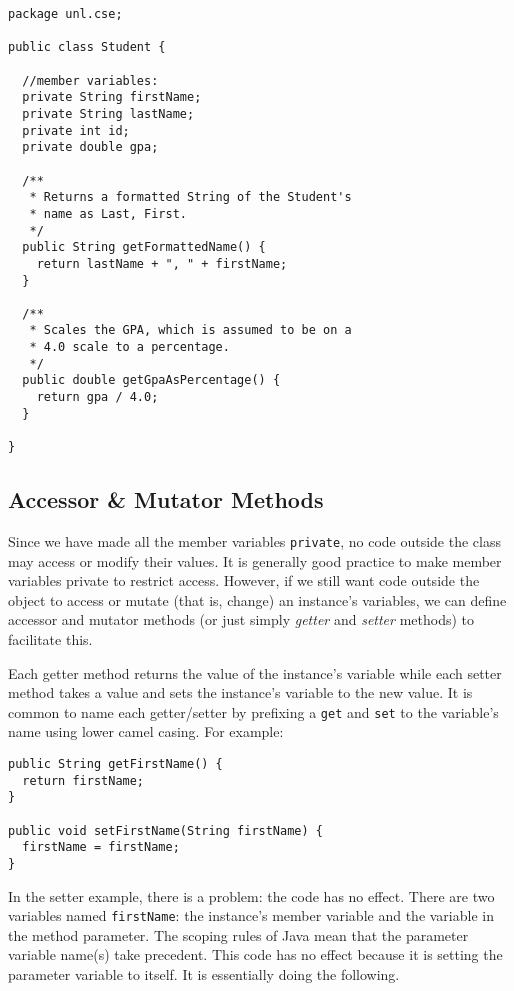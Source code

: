 \begin{verbatim}
package unl.cse;

public class Student {

  //member variables:
  private String firstName;
  private String lastName;
  private int id;
  private double gpa;
  
  /**
   * Returns a formatted String of the Student's
   * name as Last, First.
   */
  public String getFormattedName() {
    return lastName + ", " + firstName;
  }
  
  /**
   * Scales the GPA, which is assumed to be on a
   * 4.0 scale to a percentage.
   */
  public double getGpaAsPercentage() {
    return gpa / 4.0;
  }
  
}
\end{verbatim}

\subsection{Accessor \& Mutator Methods}

Since we have made all the member variables \texttt{private},
no code outside the class may access or modify their values.  It is
generally good practice to make member variables private to restrict
access.  However, if we still want code outside the object to
access or mutate (that is, change) an instance's variables, we can 
define accessor and mutator
methods (or just simply \emph{getter} and \emph{setter} methods) 
to facilitate this.

Each getter method returns the value of the instance's variable while
each setter method takes a value and sets the instance's variable to
the new value.  It is common to name each getter/setter by prefixing
a \texttt{get} and \texttt{set} to the variable's
name using lower camel casing.  For example:

\begin{verbatim}
public String getFirstName() {
  return firstName;
}

public void setFirstName(String firstName) {
  firstName = firstName;
} 
\end{verbatim}

In the setter example, there is a problem: the code has no effect.
There are two variables named \texttt{firstName}: the
instance's member variable and the variable in the method parameter.
The scoping rules of Java mean that the parameter variable name(s)
take precedent.  This code has no effect because it is setting
the parameter variable to itself.  It is essentially doing the following.

